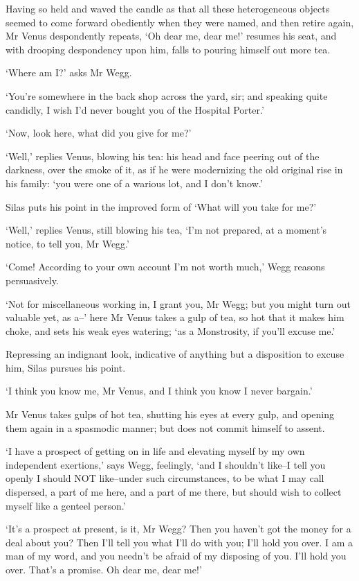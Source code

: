 Having so held and waved the candle as that all these heterogeneous
objects seemed to come forward obediently when they were named, and
then retire again, Mr Venus despondently repeats, ‘Oh dear me, dear
me!’ resumes his seat, and with drooping despondency upon him, falls to
pouring himself out more tea.

‘Where am I?’ asks Mr Wegg.

‘You’re somewhere in the back shop across the yard, sir; and speaking
quite candidly, I wish I’d never bought you of the Hospital Porter.’

‘Now, look here, what did you give for me?’

‘Well,’ replies Venus, blowing his tea: his head and face peering out
of the darkness, over the smoke of it, as if he were modernizing the old
original rise in his family: ‘you were one of a warious lot, and I don’t
know.’

Silas puts his point in the improved form of ‘What will you take for
me?’

‘Well,’ replies Venus, still blowing his tea, ‘I’m not prepared, at a
moment’s notice, to tell you, Mr Wegg.’

‘Come! According to your own account I’m not worth much,’ Wegg reasons
persuasively.

‘Not for miscellaneous working in, I grant you, Mr Wegg; but you might
turn out valuable yet, as a--’ here Mr Venus takes a gulp of tea, so
hot that it makes him choke, and sets his weak eyes watering; ‘as a
Monstrosity, if you’ll excuse me.’

Repressing an indignant look, indicative of anything but a disposition
to excuse him, Silas pursues his point.

‘I think you know me, Mr Venus, and I think you know I never bargain.’

Mr Venus takes gulps of hot tea, shutting his eyes at every gulp, and
opening them again in a spasmodic manner; but does not commit himself to
assent.

‘I have a prospect of getting on in life and elevating myself by my own
independent exertions,’ says Wegg, feelingly, ‘and I shouldn’t like--I
tell you openly I should NOT like--under such circumstances, to be what
I may call dispersed, a part of me here, and a part of me there, but
should wish to collect myself like a genteel person.’

‘It’s a prospect at present, is it, Mr Wegg? Then you haven’t got the
money for a deal about you? Then I’ll tell you what I’ll do with you;
I’ll hold you over. I am a man of my word, and you needn’t be afraid of
my disposing of you. I’ll hold you over. That’s a promise. Oh dear me,
dear me!’

